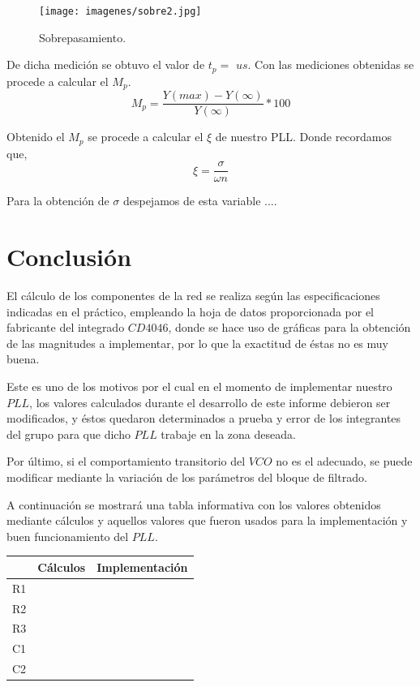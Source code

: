 \documentclass[twocolumn]{article}
\begin{document}
\begin{figure}[H]
  \centering    
  \texttt{[image: imagenes/sobre2.jpg]}
  \caption{Sobrepasamiento.}\label{fig:sobre2}
\end{figure}

De dicha medición se obtuvo el valor de $t_p = $ $us$. Con las mediciones obtenidas se procede a calcular el $M_p$.
\[ M_p = \frac{Y(max) - Y(\infty)} {Y(\infty)} * 100 \]

Obtenido el $M_p$ se procede a calcular el $\xi$ de nuestro PLL. Donde recordamos que,
\[ \xi = \frac{\sigma}{\omega n} \]

Para la obtención de $\sigma$ despejamos de esta variable ....  
\section{Conclusión}
El cálculo de los componentes de la red se realiza según las especificaciones indicadas en el práctico, empleando la hoja de datos proporcionada por el fabricante del integrado $CD4046$, donde se hace uso de gráficas para la obtención de las magnitudes a implementar, por lo que la exactitud de éstas no es muy buena.

Este es uno de los motivos por el cual en el momento de implementar nuestro $PLL$, los valores calculados durante el desarrollo de este informe debieron ser modificados, y éstos quedaron determinados a prueba y error de los integrantes del grupo para que dicho $PLL$ trabaje en la zona deseada.

Por último, si el comportamiento transitorio del $VCO$ no es el adecuado, se puede modificar mediante la variación de los parámetros del bloque de filtrado.

A continuación se mostrará una tabla informativa con los valores obtenidos mediante cálculos y aquellos valores que fueron usados para la implementación y buen funcionamiento del $PLL$.

\begin{table}[H]
\centering
\begin{tabular}{|l|l|l|}
\hline
						 & Cálculos & Implementación \\ \hline
R1                       &          &                \\ \hline
R2                       &          &                \\ \hline
R3                       &          &                \\ \hline
C1                       &          &                \\ \hline
C2                       &          &                \\ \hline
\end{tabular}
\end{table}
\end{document}
